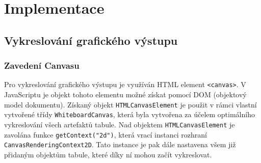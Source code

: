 \chapter{Implementace}
\label{chap:4}
\section{Vykreslování grafického výstupu}
\label{sec:4.1}
\subsection{Zavedení Canvasu}
\begin{sloppypar*}
Pro vykreslování grafického výstupu je využíván HTML element \texttt{<canvas>}.
V JavaScriptu je objekt tohoto elementu možné získat pomocí DOM (objektový model dokumentu). \cite{web:MDN/DOM}
Získaný objekt \texttt{HTMLCanvasElement} je použit v rámci vlastní vytvořené třídy \texttt{WhiteboardCanvas}, která byla vytvořena za účelem optimálního vykreslování všech artefaktů tabule.
Nad objektem \texttt{HTMLCanvasElement} je zavolána funkce \texttt{getContext("2d")}, která vrací instanci rozhraní \texttt{CanvasRenderingContext2D}.
Tato instance je pak dále nastavena všem již přidaným objektům tabule, které díky ní mohou začít vykreslovat.
\end{sloppypar*}





